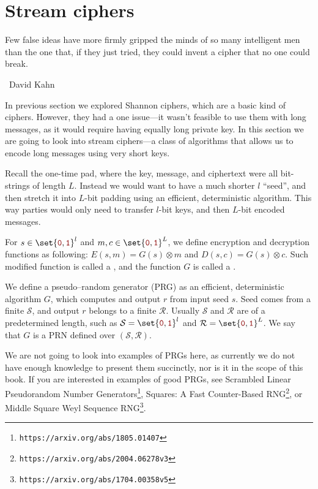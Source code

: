 \documentclass[a4paper,10pt]{article}
\makeatletter
\newcommand{\cll}[1]{\mathcal{#1}}
\newcommand{\xor}{\otimes}
\newcommand{\mtt}[1]{{\color{darkred} \mathtt{#1}}}
\newenvironment{epigraph}[1]
{\def\epigraph@quoteauthor{#1}%
  \itshape\list{}{\rightmargin\leftmargin}\item\relax}
{\endlist\par\normalfont\hfill\ \epigraph@quoteauthor\hspace*{\@tempdima}\par\bigskip}
\makeatother
\begin{document}
\section{Stream ciphers}

\begin{epigraph}{David Kahn}
  Few false ideas have more firmly gripped the minds of so many intelligent men
  than the one that, if they just tried, they could invent a cipher that no one
  could break.
\end{epigraph}

In previous section we explored Shannon ciphers, which are a basic kind of
ciphers. However, they had a one issue---it wasn't feasible to use them with
long messages, as it would require having equally long private key. In this
section we are going to look into stream ciphers---a class of algorithms that
allows us to encode long messages using very short keys.

Recall the one-time pad, where the key, message, and ciphertext were all bit-
strings of length $L$. Instead we would want to have a much shorter $l$ ``seed'',
and then stretch it into $L$-bit padding using an efficient, deterministic
algorithm. This way parties would only need to transfer $l$-bit keys, and then
$L$-bit encoded messages.

For $s \in \set{\mtt{0},\mtt{1}}^l$ and $m,c \in \set{\mtt{0},\mtt{1}}^L$, we
define encryption and decryption functions as following: $E(s,m) = G(s) \xor m$
and $D(s,c) = G(s) \xor c$. Such modified function is called a ,
and the function $G$ is called a .

We define a pseudo--random generator (PRG) as an efficient, deterministic
algorithm $G$, which computes and output $r$ from input seed $s$. Seed comes
from a finite  $\cll{S}$, and output $r$ belongs to a finite 
$\cll{R}$. Usually $\cll{S}$ and $\cll{R}$ are of a predetermined length, such
as $\cll{S} = \set{\mtt{0},\mtt{1}}^l$ and $\cll{R} = \set{\mtt{0},\mtt{1}}^L$.
We say that $G$ is a PRN defined over $\cll{(S,R)}$.

We are not going to look into examples of PRGs here, as currently we do not have
enough knowledge to present them succinctly, nor is it in the scope of this book.
If you are interested in examples of good PRGs, see Scrambled Linear Pseudorandom
Number Generators\footnote{\verb|https://arxiv.org/abs/1805.01407|}, Squares: A
Fast Counter-Based RNG\footnote{\verb|https://arxiv.org/abs/2004.06278v3|}, or
Middle Square Weyl Sequence RNG\footnote{\verb|https://arxiv.org/abs/1704.00358v5|}.
\end{document}
